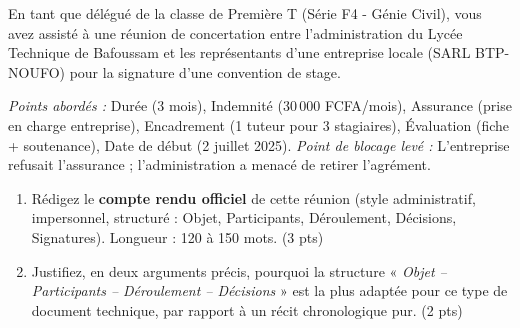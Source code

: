 \documentclass[11pt]{article}
\begin{document}
\begin{exercice}
En tant que délégué de la classe de Première T (Série F4 - Génie Civil), vous avez assisté à une réunion de concertation entre l'administration du Lycée Technique de Bafoussam et les représentants d'une entreprise locale (SARL BTP-NOUFO) pour la signature d'une convention de stage.

\textit{Points abordés :} Durée (3 mois), Indemnité (30\,000 FCFA/mois), Assurance (prise en charge entreprise), Encadrement (1 tuteur pour 3 stagiaires), Évaluation (fiche + soutenance), Date de début (2 juillet 2025). \textit{Point de blocage levé :} L'entreprise refusait l'assurance ; l'administration a menacé de retirer l'agrément.

\begin{enumerate}
    \item Rédigez le \textbf{compte rendu officiel} de cette réunion (style administratif, impersonnel, structuré : Objet, Participants, Déroulement, Décisions, Signatures). Longueur : 120 à 150 mots. (3 pts)
    \item Justifiez, en deux arguments précis, pourquoi la structure « \textit{Objet -- Participants -- Déroulement -- Décisions} » est la plus adaptée pour ce type de document technique, par rapport à un récit chronologique pur. (2 pts)
\end{enumerate}
\end{exercice}
\end{document}
